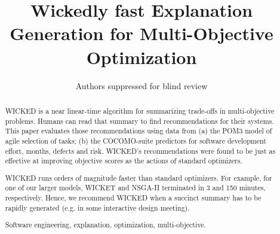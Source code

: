 \documentclass[runningheads]{llncs}
\newcommand{\keywords}[1]{\par\addvspace\baselineskip
\noindent\keywordname\enspace\ignorespaces#1}
\begin{document}
%

\mainmatter  %

\title{Wickedly fast Explanation Generation
for Multi-Objective Optimization}


%
%
\author{Authors suppressed for blind review}

%


%
%
 
\maketitle


\begin{abstract}
WICKED is a near linear-time 
algorithm for summarizing trade-offs in multi-objective problems.
Humans can read that summary to find recommendations for their systems.
This paper evaluates those recommendations using data
 from   (a) the POM3 model of agile selection
of tasks; (b) the COCOMO-suite predictors for software
development effort, months, defects and risk.
 WICKED's recommendations 
 were found to be just as effective at improving objective
scores as the actions of standard  optimizers.


WICKED runs orders of magnitude faster than  standard optimizers. For example, for one of our larger models,
WICKET and NSGA-II terminated in 
3 and 150 minutes, respectively.
Hence, we recommend WICKED when a succinct summary
has to be rapidly generated (e.g.  in some
interactive design meeting). 

\keywords{Software engineering, explanation, optimization, multi-objective.}
\end{abstract}
\end{document}
